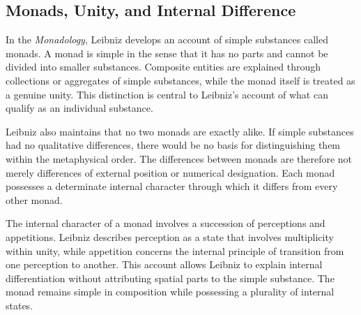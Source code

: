 
\subsection{Monads, Unity, and Internal Difference}
\label{subsec:ch08-leibniz-monads}

\label{para:VS.B01.P01.C08.S07.SS06.P001}

In the \textit{Monadology}, Leibniz develops an
account of simple substances called monads.
A monad is simple in the sense that it has
no parts and cannot be divided into smaller
substances. Composite entities are explained
through collections or aggregates of simple
substances, while the monad itself is treated
as a genuine unity. This distinction is
central to Leibniz's account of what can
qualify as an individual substance. \cite[§§1--6]{LeibnizMonadology}

\label{para:VS.B01.P01.C08.S07.SS06.P002}

Leibniz also maintains that no two monads are
exactly alike. If simple substances had no
qualitative differences, there would be no
basis for distinguishing them within the
metaphysical order. The differences between
monads are therefore not merely differences
of external position or numerical designation.
Each monad possesses a determinate internal
character through which it differs from
every other monad. \cite[§§8--9]{LeibnizMonadology}

\label{para:VS.B01.P01.C08.S07.SS06.P003}

The internal character of a monad involves
a succession of perceptions and appetitions.
Leibniz describes perception as a state
that involves multiplicity within unity,
while appetition concerns the internal
principle of transition from one perception
to another. This account allows Leibniz
to explain internal differentiation without
attributing spatial parts to the simple
substance. The monad remains simple in
composition while possessing a plurality
of internal states. \cite[§§13--18]{LeibnizMonadology}

\label{para:VS.B01.P01.C08.S07.SS06.P004}

